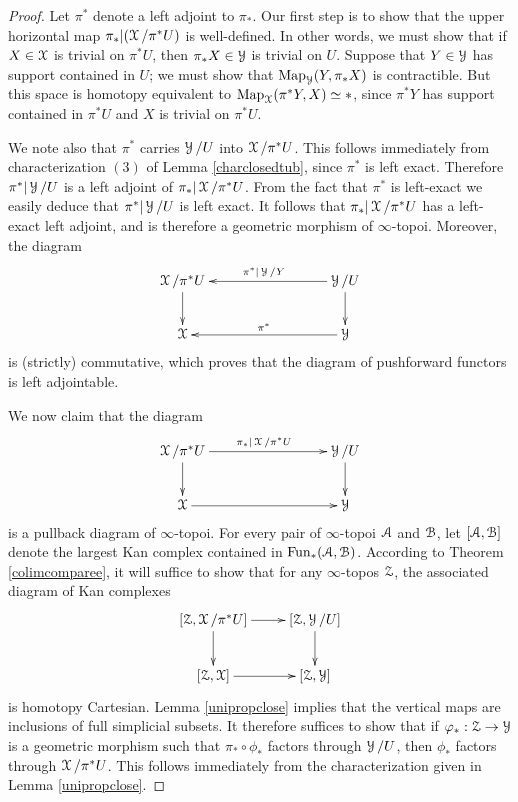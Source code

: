 \begin{proof}
Let $\pi^{\ast}$ denote a left adjoint to $\pi_{\ast}$.
Our first step is to show that the upper horizontal map $\pi_{\ast} |(\operatorname{\mathcal{X}}/\pi^{\ast}U)$ is well-defined. In other words, we must show that if $X \in \operatorname{\mathcal{X}}$ is trivial on $\pi^{\ast} U$, then
$\pi_{\ast} X \in \operatorname{\mathcal{Y}}$ is trivial on $U$. Suppose that $Y \in \operatorname{\mathcal{Y}}$ has support contained in $U$; we must show that $\operatorname{{Map}}_{\operatorname{\mathcal{Y}}}(Y, \pi_{\ast} X)$ is contractible. But this space is homotopy equivalent to $\operatorname{{Map}}_{\operatorname{\mathcal{X}}}( \pi^{\ast} Y, X) \simeq \ast$, since $\pi^{\ast} Y$ has support contained in $\pi^{\ast} U$ and $X$ is trivial on $\pi^{\ast} U$.

We note also that $\pi^{\ast}$ carries $\operatorname{\mathcal{Y}}/U$ into $\operatorname{\mathcal{X}}/\pi^{\ast}U$. This follows immediately from characterization $(3)$ of Lemma \ref{charclosedtub}, since $\pi^{\ast}$ is left exact. Therefore $\pi^{\ast}| \operatorname{\mathcal{Y}}/U$ is a left adjoint of $\pi_{\ast} | \operatorname{\mathcal{X}}/\pi^{\ast}U$. From the fact that $\pi^{\ast}$ is left-exact we easily deduce that $\pi^{\ast}| \operatorname{\mathcal{Y}}/U$ is left exact. It follows that $\pi_{\ast}|\operatorname{\mathcal{X}}/\pi^{\ast}U$ has a left-exact left adjoint, and is therefore a geometric morphism of $\infty$-topoi.
Moreover, the diagram
$$ \xymatrix{ \calX/\pi^{\ast}U \ar[d] & & & \calY/U \ar[d] \ar[lll]_{\pi^{\ast} | \calY/Y} \\
\calX & & & \calY \ar[lll]_{\pi^{\ast}} }$$
is (strictly) commutative, which proves that the diagram of pushforward functors is left adjointable.

We now claim that the diagram 
$$ \xymatrix{ \calX/\pi^{\ast}U \ar[rrr]^{\pi_{\ast} | \calX/\pi^{\ast}U} \ar[d] & &  & \calY/U \ar[d] \\
\calX \ar[rrr] & &  & \calY }$$
is a pullback diagram of $\infty$-topoi. For every pair of $\infty$-topoi $\operatorname{\mathcal{A}}$ and $\operatorname{\mathcal{B}}$,
let $[\operatorname{\mathcal{A}}, \operatorname{\mathcal{B}}]$ denote the largest Kan complex contained in $\operatorname{Fun}_{\ast}(\operatorname{\mathcal{A}}, \operatorname{\mathcal{B}})$. According to Theorem \ref{colimcomparee}, it will suffice to show that for any $\infty$-topos $\operatorname{\mathcal{Z}}$, the associated diagram of Kan complexes
$$ \xymatrix{ [\calZ, \calX/\pi^{\ast}U] \ar[r] \ar[d] & [\calZ, \calY/U] \ar[d] \\
[\calZ, \calX] \ar[r] & [\calZ, \calY] }$$
is homotopy Cartesian. Lemma \ref{unipropclose} implies that the vertical maps are inclusions of full simplicial subsets. 
It therefore suffices to show that if $\varphi_{\ast}: \operatorname{\mathcal{Z}} \rightarrow \operatorname{\mathcal{Y}}$ is a geometric morphism
such that $\pi_{\ast} \circ \phi_{\ast}$ factors through $\operatorname{\mathcal{Y}}/U$, then
$\phi_{\ast}$ factors through $\operatorname{\mathcal{X}}/\pi^{\ast}U$. This follows immediately from the characterization given in Lemma \ref{unipropclose}.
\end{proof}

